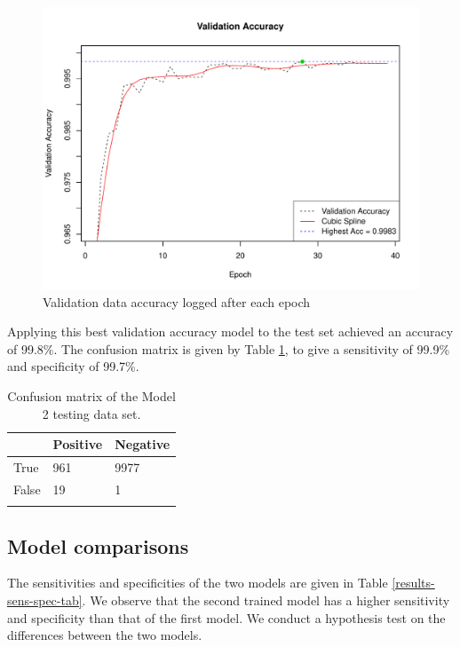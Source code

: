 \begin{figure}[ht]
	\centering
	\includegraphics[width=\textwidth]{Images/7_valid_acc5.pdf}
	\caption{Validation data accuracy logged after each epoch}
	\label{results-valid-acc5-fig}
\end{figure}

Applying this best validation accuracy model to the test set achieved an accuracy of 99.8\%. The confusion matrix is given by Table \ref{results-confmat5-tab}, to give a sensitivity of 99.9\% and specificity of 99.7\%.

\begin{table}[ht]
	\centering
	\begin{tabular}{@{}lll@{}}
	\toprule[1.5pt]
	& Positive & Negative\\
	\midrule
	True & 961 & 9977\\
	False & 19 & 1\\
	\bottomrule[1.5pt]\\
	\end{tabular}
	\caption{Confusion matrix of the Model 2 testing data set.}
	\label{results-confmat5-tab}
\end{table}

\subsection*{Model comparisons}

The sensitivities and specificities of the two models are given in Table \ref{results-sens-spec-tab}. We observe that the second trained model has a higher sensitivity and specificity than that of the first model. We conduct a hypothesis test on the differences between the two models.

